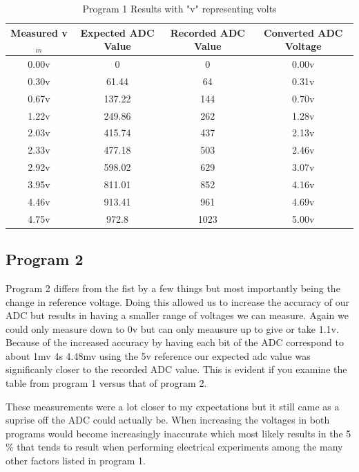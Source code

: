 \documentclass[11pt,pdftex,portrait,letterpaper]{article}
\begin{document}
\begin{table}[htb]
	\centering
	\begin{tabular}{ | c | c | c | c | }	%
		\hline
		\textbf{Measured v$_{in}$} & \textbf{Expected ADC Value} & \textbf{Recorded ADC Value} & \textbf{Converted ADC Voltage} \\ \hline \hline
		0.00v & 0 & 0  & 0.00v \\ \hline
		0.30v & 61.44 & 64  & 0.31v \\ \hline
		0.67v & 137.22 & 144  & 0.70v \\ \hline
		1.22v & 249.86 & 262 & 1.28v \\ \hline
		2.03v & 415.74 &  437 & 2.13v \\ \hline
		2.33v & 477.18 &  503 & 2.46v \\ \hline
		2.92v & 598.02 &  629 & 3.07v \\ \hline
		3.95v & 811.01 &  852 & 4.16v \\ \hline
		4.46v & 913.41 & 961  & 4.69v \\ \hline
		4.75v & 972.8 & 1023  & 5.00v \\ \hline
		
	\end{tabular}
	\caption{Program 1 Results with "v" representing volts }
	\label{t:table1}	%
\end{table}
	
	
	
	\subsection{Program 2}
	
Program 2 differs from the fist by a few things but most importantly being the change in reference voltage. Doing this allowed us to increase the accuracy of our ADC but results in having a smaller range of voltages we can measure. Again we could only measure down to 0v but can only meausure up to give or take 1.1v. Because of the increased accuracy by having each bit of the ADC correspond to about 1mv 4s 4.48mv using the 5v reference our expected adc value was significanly closer to the recorded ADC value. This is evident if you examine the table from program 1 versus that of program 2. 

These measurements were a lot closer to my expectations but it still came as a suprise off the ADC could actually be. When increasing the voltages in both programs would become increasingly inaccurate which most likely results in the 5 \% that tends to result when performing electrical experiments among the many other factors listed in program 1.
	
\end{document}
